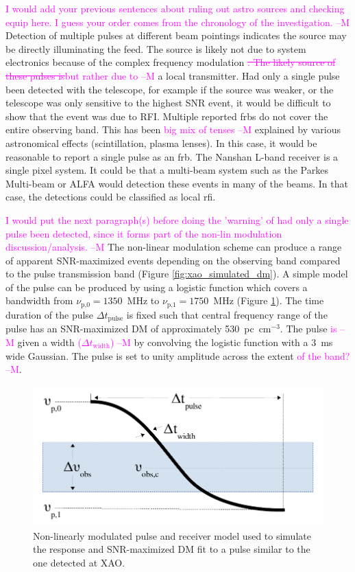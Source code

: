 \documentclass[a4paper,fleqn,usenatbib]{mnras}
\newcommand{\cM}[1]{\textcolor{magenta}{ #1 --M}}
\begin{document}
\cM{I would add your previous sentences about ruling out astro sources and checking equip here. I guess your order comes from the chronology of the investigation.}
Detection of multiple pulses at different beam pointings indicates the source
may be directly illuminating the feed. The source is likely not due to system
electronics because of the complex frequency modulation\cM{\sout{. The likely source of
these pulses is}but rather due to} a local transmitter. Had only a single pulse been detected with
the telescope, for example if the source was weaker, or the telescope was only
sensitive to the highest SNR event, it would be difficult to show that the event
was due to RFI. Multiple reported \glspl{frb} do not cover the entire observing
band. This has been \cM{big mix of tenses} explained by various astronomical effects (scintillation,
plasma lenses). In this case, it would be reasonable to report a single pulse as
an \gls{frb}. The Nanshan L-band receiver is a single pixel system. It could be
that a multi-beam system such as the Parkes Multi-beam or ALFA would detection
these events in many of the beams. In that case, the detections could be
classified as local \gls{rfi}.

\cM{I would put the next paragraph(s) before doing the 'warning' of had only a single pulse been detected, since it forms part of the non-lin modulation discussion/analysis.}
The non-linear modulation scheme can produce a range of apparent SNR-maximized
events depending on the observing band compared to the pulse transmission band
(Figure \ref{fig:xao_simulated_dm}).  A simple model of the pulse can be
produced by using a logistic function which covers a bandwidth from
$\nu_{\textrm{p,0}} = 1350$~MHz to $\nu_{\textrm{p,1}} = 1750$~MHz (Figure
\ref{fig:xao_simulation_diagram}). The time duration of the pulse $\Delta
t_{\textrm{pulse}}$ is fixed such that central frequency range of the pulse has
an SNR-maximized DM of approximately 530~pc~cm$^{-3}$. The pulse \cM{is} given a width
\cM{($\Delta t_{\textrm{width}}$)} by convolving the logistic function with a 3~ms wide
Gaussian. The pulse is set to unity amplitude across the extent \cM{of the band?}.

\begin{figure}
    \includegraphics[width=1.0\linewidth]{figures/simulation_diagram.pdf}
    \caption{Non-linearly modulated pulse and receiver model used to simulate
    the response and SNR-maximized DM fit to a pulse similar to the one detected
    at XAO.
    }
    \label{fig:xao_simulation_diagram}
\end{figure}
\end{document}
